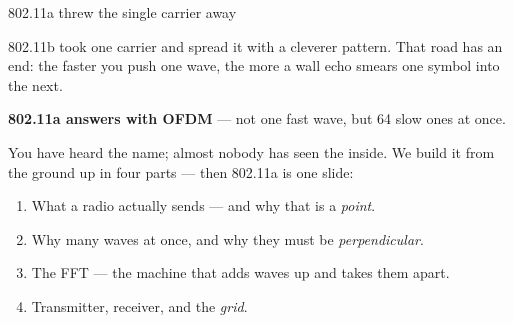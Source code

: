 \begin{frame}{802.11a threw the single carrier away}
  \vspace{0.3em}
  {\small 802.11b took one carrier and spread it with a cleverer pattern. That road
   has an end: the faster you push one wave, the more a wall echo smears one symbol
   into the next.\par}

  \vspace{0.45em}
  {\large\textbf{802.11a answers with OFDM}  --- not one fast wave, but 64 slow ones at once.\par}

  \vspace{0.4em}
  {\small You have heard the name; almost nobody has seen the inside. We build it from
   the ground up in four parts --- then 802.11a is one slide:\par}
  \vspace{0.1em}
  {\small
  \begin{enumerate}\itemsep0pt
    \item What a radio actually sends --- and why that is a \emph{point}.
    \item Why many waves at once, and why they must be \emph{perpendicular}.
    \item The FFT --- the machine that adds waves up and takes them apart.
    \item Transmitter, receiver, and the \emph{grid}.
  \end{enumerate}}

  \vspace{0.25em}
\end{frame}

